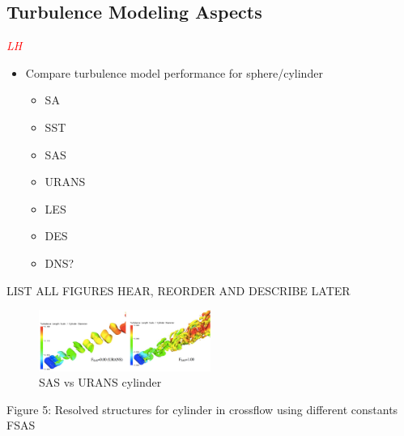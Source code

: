 \documentclass[journal]{new-aiaa}
\begin{document}
\subsection{Turbulence Modeling Aspects} \label{subsec:turbulencemodeling}

\textcolor{red}{\emph{LH}}

\begin{itemize}
    \item Compare turbulence model performance for sphere/cylinder
    \begin{itemize}
        \item SA
        \item SST
        \item SAS
        \item URANS
        \item LES
        \item DES
        \item DNS?
    \end{itemize}
\end{itemize}


LIST ALL FIGURES HEAR, REORDER AND DESCRIBE LATER


\begin{figure}[H]
\begin{center}
\includegraphics[width=0.5\textwidth]{Images/logan/menter2005scaleadaptive_cylinderwake.pdf}
\caption{ SAS vs URANS cylinder \cite{menter2005scaleadaptive} }
\label{fig:sasvsuranscylinder}
\end{center}
\end{figure}

Figure 5: Resolved structures for cylinder in crossflow using different constants FSAS
\end{document}
